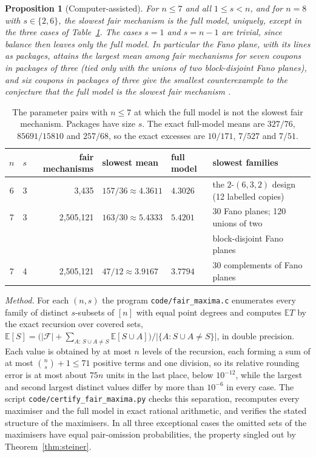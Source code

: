 \documentclass[11pt,a4paper]{article}
\newtheorem{proposition}[theorem]{Proposition}
\theoremstyle{remark}
\newcommand{\E}{\mathbb E}
\begin{document}
\begin{proposition}[Computer-assisted]\label{prop:small}
For $n\le7$ and all $1\le s<n$, and for $n=8$ with $s\in\{2,6\}$, the slowest fair mechanism is the full model, uniquely, except in the three cases of Table~\ref{tab:small}. The cases $s=1$ and $s=n-1$ are trivial, since balance then leaves only the full model. In particular the Fano plane, with its lines as packages, attains the largest mean among fair mechanisms for seven coupons in packages of three (tied only with the unions of two block-disjoint Fano planes), and six coupons in packages of three give the smallest counterexample to the conjecture that the full model is the slowest fair mechanism \cite[Conjecture~2]{gy}.
\end{proposition}

\begin{table}[ht]
\centering
\small
\begin{tabular}{@{}ccrlll@{}}
\toprule
$n$ & $s$ & fair mechanisms & slowest mean & full model & slowest families \\
\midrule
6 & 3 & 3{,}435 & $157/36\approx4.3611$ & $4.3026$ & the $2$-$(6,3,2)$ design (12 labelled copies) \\
7 & 3 & 2{,}505{,}121 & $163/30\approx5.4333$ & $5.4201$ & 30 Fano planes; 120 unions of two \\
 & & & & & \quad block-disjoint Fano planes \\
7 & 4 & 2{,}505{,}121 & $47/12\approx3.9167$ & $3.7794$ & 30 complements of Fano planes \\
\bottomrule
\end{tabular}
\caption{The parameter pairs with $n\le7$ at which the full model is not the slowest fair mechanism. Packages have size $s$. The exact full-model means are $327/76$, $85691/15810$ and $257/68$, so the exact excesses are $10/171$, $7/527$ and $7/51$.}
\label{tab:small}
\end{table}

\emph{Method.} For each $(n,s)$ the program \nolinkurl{code/fair_maxima.c} enumerates every family of distinct $s$-subsets of $[n]$ with equal point degrees and computes $\E T$ by the exact recursion over covered sets, $\E[S]=\big(|\mathcal F|+\sum_{A:\,S\cup A\ne S}\E[S\cup A]\big)/|\{A:S\cup A\ne S\}|$, in double precision. Each value is obtained by at most $n$ levels of the recursion, each forming a sum of at most $\binom ns+1\le71$ positive terms and one division, so its relative rounding error is at most about $75n$ units in the last place, below $10^{-12}$, while the largest and second largest distinct values differ by more than $10^{-6}$ in every case. The script \nolinkurl{code/certify_fair_maxima.py} checks this separation, recomputes every maximiser and the full model in exact rational arithmetic, and verifies the stated structure of the maximisers. In all three exceptional cases the omitted sets of the maximisers have equal pair-omission probabilities, the property singled out by Theorem~\ref{thm:steiner}.
\end{document}
